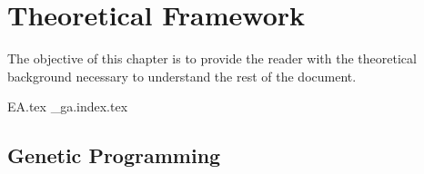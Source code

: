 \chapter{Theoretical Framework}
\label{chap:theoretical_framework}
  The objective of this chapter is to provide the reader with the theoretical 
  background necessary to understand the rest of the document.
  
  {EA.tex}
  {_ga.index.tex}

  \section{Genetic Programming}
  \label{sec:genetic_programming}
    \Blindtext